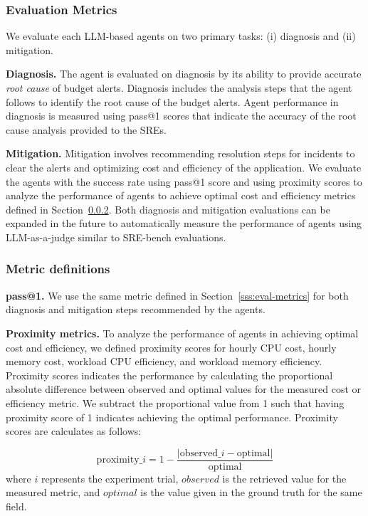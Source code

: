 \subsubsection{Evaluation Metrics}
We evaluate each LLM-based agents on two primary tasks: (i) diagnosis and (ii) mitigation.

\textbf{Diagnosis.}
The agent is evaluated on diagnosis by its ability to provide accurate \textit{root cause} of budget alerts.
Diagnosis includes the analysis steps that the agent follows to identify the root cause of the budget alerts.
Agent performance in diagnosis is measured using pass@1 scores that indicate the accuracy of the root cause analysis provided to the SREs. 


\textbf{Mitigation.}
Mitigation involves recommending resolution steps for incidents to clear the alerts and optimizing cost and efficiency of the application.  
We evaluate the agents with the success rate using pass@1 score and using proximity scores to analyze the performance of agents to achieve optimal cost and efficiency metrics defined in Section~\ref{s:finopsMetricDef}.
Both diagnosis and mitigation evaluations can be expanded in the future to automatically measure the performance of agents using LLM-as-a-judge similar to SRE-bench evaluations.

\subsubsection{Metric definitions}
\label{s:finopsMetricDef}
\textbf{pass@1.}
We use the same metric defined in Section~\ref{sss:eval-metrics} for both diagnosis and mitigation steps recommended by the agents. 

\textbf{Proximity metrics.} To analyze the performance of agents in achieving optimal cost and efficiency, we defined proximity scores for hourly CPU cost, hourly memory cost, workload CPU efficiency, and workload memory efficiency. Proximity scores indicates the performance by calculating the proportional absolute difference between observed and optimal values for the measured cost or efficiency metric. We subtract the proportional value from 1 such that having proximity score of 1 indicates achieving the optimal performance. Proximity scores are calculates as follows:

$$\text{proximity}\_i = 1 - \frac{| \text{observed}\_i - \text{optimal} |}{\text{optimal}}$$
where $i$ represents the experiment trial, $observed$ is the retrieved value for the measured metric, and $optimal$ is the value given in the ground truth for the same field.


